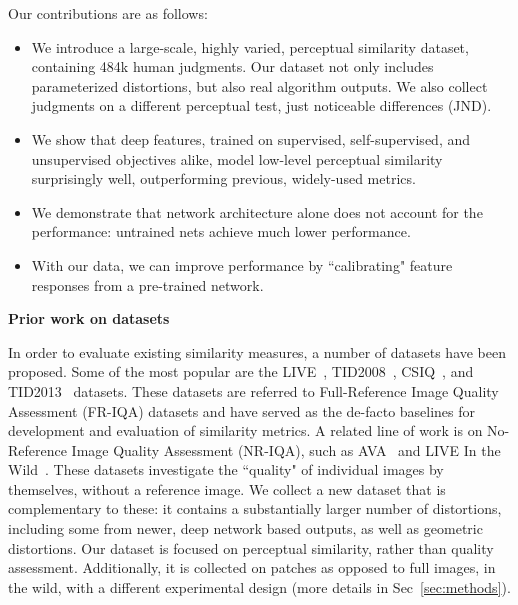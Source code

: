 Our contributions are as follows:

\begin{itemize}[noitemsep,nolistsep]
    \item We introduce a large-scale, highly varied, perceptual similarity dataset, containing 484k human judgments. Our dataset not only includes parameterized distortions, but also real algorithm outputs. We also collect judgments on a different perceptual test, just noticeable differences (JND).

    \item We show that deep features, trained on supervised, self-supervised, and unsupervised objectives alike, model low-level perceptual similarity surprisingly well, outperforming previous, widely-used metrics.

    \item We demonstrate that network architecture alone does not account for the performance: untrained nets achieve much lower performance.

    \item With our data, we can improve performance by ``calibrating" feature responses from a pre-trained network.

\end{itemize}

  \textbf{Prior work on datasets} \ \ 

In order to evaluate existing similarity measures, a number of datasets have been proposed. Some of the most popular are the LIVE~\cite{sheikh2006statistical}, TID2008~\cite{ponomarenko2009tid2008},  CSIQ~\cite{larson2010most}, and TID2013~\cite{ponomarenko2015image} datasets. These datasets are referred to Full-Reference Image Quality Assessment (FR-IQA) datasets and have served as the de-facto baselines for development and evaluation of similarity metrics. A related line of work is on No-Reference Image Quality Assessment (NR-IQA), such as AVA~\cite{murray2012ava} and LIVE In the Wild~\cite{ghadiyaram2016massive}. These datasets investigate the ``quality" of individual images by themselves, without a reference image. We collect a new dataset that is complementary to these: it contains a substantially larger number of distortions, including some from newer, deep network based outputs, as well as geometric distortions. Our dataset is focused on perceptual similarity, rather than quality assessment. Additionally, it is collected on patches as opposed to full images, in the wild, with a different experimental design (more details in Sec~\ref{sec:methods}).

